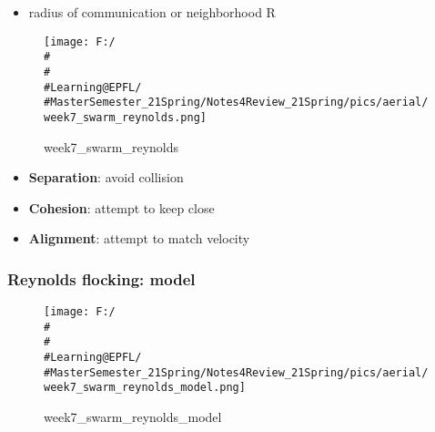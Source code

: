 \documentclass[]{article}
\begin{document}
\begin{itemize}
\item
  radius of communication or neighborhood R
\end{itemize}

\begin{figure}
\centering
\texttt{[image: F:/\\\#\\\#\\\#Learning@EPFL/\\\#MasterSemester\_21Spring/Notes4Review\_21Spring/pics/aerial/week7\_swarm\_reynolds.png]}
\caption{week7\_swarm\_reynolds}
\end{figure}

\begin{itemize}
\item
  \textbf{Separation}: avoid collision
\item
  \textbf{Cohesion}: attempt to keep close
\item
  \textbf{Alignment}: attempt to match velocity
\end{itemize}

\subsubsection{Reynolds flocking: model}\label{header-n1268}

\begin{figure}
\centering
\texttt{[image: F:/\\\#\\\#\\\#Learning@EPFL/\\\#MasterSemester\_21Spring/Notes4Review\_21Spring/pics/aerial/week7\_swarm\_reynolds\_model.png]}
\caption{week7\_swarm\_reynolds\_model}
\end{figure}
\end{document}
